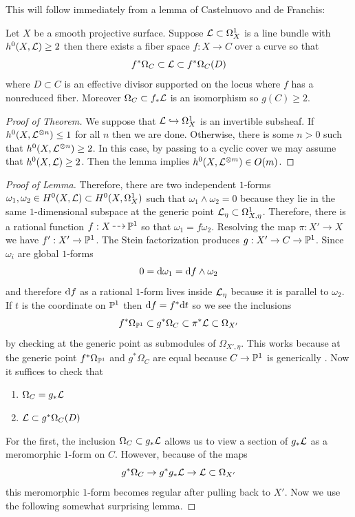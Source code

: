 \documentclass[main.tex]{subfiles}
\begin{document}
This will follow immediately from a lemma of Castelnuovo and de Franchis:

\begin{lemma}
Let $X$ be a smooth projective surface. Suppose $\L \subset \Omega_X^1$ is a line bundle with $h^0(X, \L) \ge 2$ then there exists a fiber space $f : X \to C$ over a curve so that
\[ f^* \Omega_C \subset \L \subset f^* \Omega_C(D) \]
where $D \subset C$ is an effective divisor supported on the locus where $f$ has a nonreduced fiber. %
Moreover $\Omega_C \subset f_* \L$ is an isomorphism so $g(C) \ge 2$.
\end{lemma}

\begin{proof}[Proof of Theorem]
We suppose that $\L \embed \Omega_X^1$ is an invertible subsheaf. If $h^0(X, \L^{\ot n}) \le 1$ for all $n$ then we are done. Otherwise, there is some $n > 0$ such that $h^0(X, \L^{\ot n}) \ge 2$. In this case, by passing to a cyclic cover we may assume that $h^0(X, \L) \ge 2$. Then the lemma implies $h^0(X, \L^{\ot m}) \in O(m)$.
\end{proof}

\begin{proof}[Proof of Lemma]
Therefore, there are two independent $1$-forms $\omega_1, \omega_2 \in H^0(X, \L) \subset H^0(X, \Omega^1_X)$ such that $\omega_1 \wedge \omega_2 = 0$ because they lie in the same $1$-dimensional subspace at the generic point $\L_{\eta} \subset \Omega_{X, \eta}^1$. Therefore, there is a rational function $f : X \rat \P^1$ so that $\omega_1 = f \omega_2$. Resolving the map $\pi : X' \to X$ we have $f' : X' \to \P^1$. The Stein factorization produces $g : X' \to C \to \P^1$. Since $\omega_i$ are global $1$-forms
\[ 0 = \d{\omega_1} = \d{f} \wedge \omega_2 \]
and therefore $\d{f}$ as a rational $1$-form lives inside $\L_{\eta}$ because it is parallel to $\omega_2$. If $t$ is the coordinate on $\P^1$ then $\d{f} = f^* \d{t}$ so we see the inclusions
\[ f^* \Omega_{\P^1} \subset g^* \Omega_{C} \subset \pi^* \L \subset \Omega_{X'} \]
by checking at the generic point as submodules of $\Omega_{X',\eta}$. This works because at the generic point $f^* \Omega_{\P^1}$ and $g^* \Omega_C$ are equal because $C \to \P^1$ is generically \etale. Now it suffices to check that
\begin{enumerate}
\item $\Omega_C = g_* \L$
\item $\L \subset g^* \Omega_C(D)$
\end{enumerate}
For the first, the inclusion $\Omega_C \subset g_* \L$ allows us to view a section of $g_* \L$ as a meromorphic $1$-form on $C$. However, because of the maps
\[ g^* \Omega_C \to g^* g_* \L \to \L \subset \Omega_{X'} \]
this meromorphic $1$-form becomes regular after pulling back to $X'$. Now we use the following somewhat surprising lemma.
\end{proof}
\end{document}
